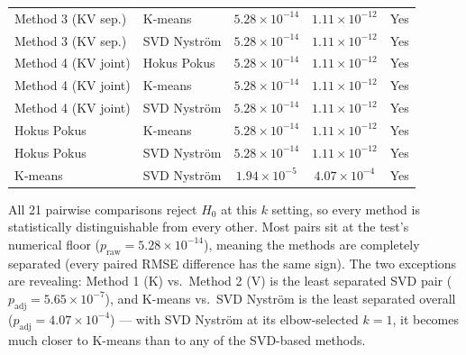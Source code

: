 \begin{table}[H]
\begin{tabular}{ll cc c}
Method 3 (KV sep.) & K-means              & $5.28 \times 10^{-14}$ & $1.11 \times 10^{-12}$ & Yes \\
Method 3 (KV sep.) & SVD Nyström          & $5.28 \times 10^{-14}$ & $1.11 \times 10^{-12}$ & Yes \\
\addlinespace
Method 4 (KV joint) & Hokus Pokus         & $5.28 \times 10^{-14}$ & $1.11 \times 10^{-12}$ & Yes \\
Method 4 (KV joint) & K-means             & $5.28 \times 10^{-14}$ & $1.11 \times 10^{-12}$ & Yes \\
Method 4 (KV joint) & SVD Nyström         & $5.28 \times 10^{-14}$ & $1.11 \times 10^{-12}$ & Yes \\
\addlinespace
Hokus Pokus         & K-means             & $5.28 \times 10^{-14}$ & $1.11 \times 10^{-12}$ & Yes \\
Hokus Pokus         & SVD Nyström         & $5.28 \times 10^{-14}$ & $1.11 \times 10^{-12}$ & Yes \\
\addlinespace
K-means             & SVD Nyström         & $1.94 \times 10^{-5}$  & $4.07 \times 10^{-4}$  & Yes \\
\bottomrule
\end{tabular}
\end{table}

\noindent All 21 pairwise comparisons reject $H_0$ at this $k$ setting, so every method is
statistically distinguishable from every other. Most pairs sit at the test's numerical floor
($p_\text{raw} = 5.28\times10^{-14}$), meaning the methods are completely separated (every paired
RMSE difference has the same sign). The two exceptions are revealing: Method 1 (K) vs.\ Method 2
(V) is the least separated SVD pair ($p_\text{adj} = 5.65\times10^{-7}$), and K-means vs.\ SVD
Nyström is the least separated overall ($p_\text{adj} = 4.07\times10^{-4}$) --- with SVD Nyström
at its elbow-selected $k=1$, it becomes much closer to K-means than to any of the SVD-based methods.



